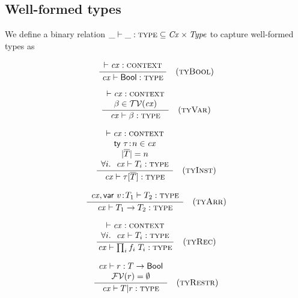 
\subsection{Well-formed types}

We define a binary relation $\binrel{\istyY}{\Cx}{\Typ}$ to capture
well-formed types as

\[
\rruleI
 {\cxwfO}
 {\istyO{\bool}}
 {\Rtbool}
\]

\[
\rruleII
 {\cxwfO}
 {\tvar\in\cxtvarO}
 {\istyO{\tvar}}
 {\Rtvar}
\]

\[
\rruleIV
 {\cxwfO}
 {\tdecO\in\cx}
 {\seqlen{\typS}=n}
 {\FORALL{i}{\istyO{\typ_i}}}
 {\istyO{\tinstO}}
 {\Rtinst}
\]

\[
\rruleI
 {\isty{\snoc{\cx}{\vdec{\var}{\typ_1}}}{\typ_2}}
 {\istyO{\tarrO}}
 {\Rtarr}
\]

\[
\rruleII
 {\cxwfO}
 {\FORALL{i}{\istyO{\typ_i}}}
 {\istyO{\trecO}}
 {\Rtrec}
\]

\[
\rruleII
 {\hastyO{\tspred}{\tarr{\typ}{\bool}}}
 {\efvar{\tspred}=\emptyset}
 {\istyO{\tsubO}}
 {\Rtsub}
\]

